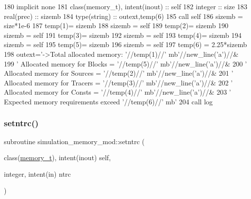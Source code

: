 \begin{DoxyCode}
180     \textcolor{keywordtype}{implicit none}
181     \textcolor{keywordtype}{class}(memory\_t), \textcolor{keywordtype}{intent(inout)} :: self
182     \textcolor{keywordtype}{integer} :: size
183     \textcolor{keywordtype}{real(prec)} :: sizemb
184     \textcolor{keywordtype}{type}(string) :: outext,temp(6)
185     \textcolor{keyword}{call }self%
186     sizemb = size*1e-6
187     temp(1)= sizemb
188     sizemb = self%
189     temp(2)= sizemb
190     sizemb = self%
191     temp(3)= sizemb
192     sizemb = self%
193     temp(4)= sizemb
194     sizemb = self%
195     temp(5)= sizemb
196     sizemb = self%
197     temp(6) = 2.25*sizemb
198     outext=\textcolor{stringliteral}{'->Total allocated memory: '}//temp(1)//\textcolor{stringliteral}{' mb'}//new\_line(\textcolor{stringliteral}{'a'})//&
199         \textcolor{stringliteral}{'       Allocated memory for Blocks  = '}//temp(5)//\textcolor{stringliteral}{' mb'}//new\_line(\textcolor{stringliteral}{'a'})//&
200         \textcolor{stringliteral}{'       Allocated memory for Sources = '}//temp(2)//\textcolor{stringliteral}{' mb'}//new\_line(\textcolor{stringliteral}{'a'})//&
201         \textcolor{stringliteral}{'       Allocated memory for Tracers = '}//temp(3)//\textcolor{stringliteral}{' mb'}//new\_line(\textcolor{stringliteral}{'a'})//&
202         \textcolor{stringliteral}{'       Allocated memory for Consts  = '}//temp(4)//\textcolor{stringliteral}{' mb'}//new\_line(\textcolor{stringliteral}{'a'})//&
203         \textcolor{stringliteral}{'       Expected memory requirements exceed '}//temp(6)//\textcolor{stringliteral}{' mb'}
204     \textcolor{keyword}{call }log%
\end{DoxyCode}
\mbox{\label{namespacesimulation__memory__mod_ab16ab3a2c4acf078dd1a9e75778f64df}} 
\subsubsection{\texorpdfstring{setntrc()}{setntrc()}}
{\footnotesize\ttfamily subroutine simulation\+\_\+memory\+\_\+mod\+::setntrc (\begin{DoxyParamCaption}\item[{class(\mbox{\hyperlink{structsimulation__memory__mod_1_1memory__t}{memory\+\_\+t}}), intent(inout)}]{self,  }\item[{integer, intent(in)}]{ntrc }\end{DoxyParamCaption})\hspace{0.3cm}{\ttfamily [private]}}



